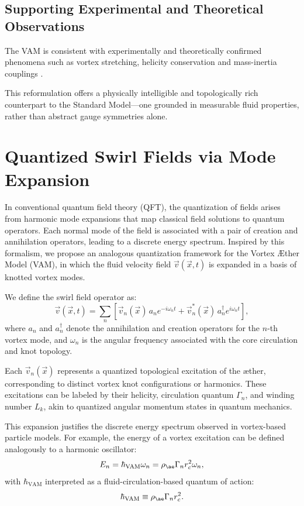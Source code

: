 \subsection*{Supporting Experimental and Theoretical Observations}
The VAM is consistent with experimentally and theoretically confirmed phenomena such as vortex stretching, helicity conservation and mass-inertia couplings \cite{batchelor1953,vinen2002,bewley2008,moffatt1969,kleckner2013,scheeler2014,bartlett1986}.

This reformulation offers a physically intelligible and topologically rich counterpart to the Standard Model—one grounded in measurable fluid properties, rather than abstract gauge symmetries alone.

\section{Quantized Swirl Fields via Mode Expansion}

In conventional quantum field theory (QFT), the quantization of fields arises from harmonic mode expansions that map classical field solutions to quantum operators. Each normal mode of the field is associated with a pair of creation and annihilation operators, leading to a discrete energy spectrum. Inspired by this formalism, we propose an analogous quantization framework for the Vortex Æther Model (VAM), in which the fluid velocity field $\vec{v}(\vec{x}, t)$ is expanded in a basis of knotted vortex modes.

We define the swirl field operator as:
\begin{equation}
\vec{v}(\vec{x}, t) = \sum_n \left[ \vec{v}_n(\vec{x})\, a_n e^{-i\omega_n t} + \vec{v}_n^*(\vec{x})\, a_n^\dagger e^{i\omega_n t} \right],
\end{equation}
where $a_n$ and $a_n^\dagger$ denote the annihilation and creation operators for the $n$-th vortex mode, and $\omega_n$ is the angular frequency associated with the core circulation and knot topology.

Each $\vec{v}_n(\vec{x})$ represents a quantized topological excitation of the æther, corresponding to distinct vortex knot configurations or harmonics. These excitations can be labeled by their helicity, circulation quantum $\Gamma_n$, and winding number $L_k$, akin to quantized angular momentum states in quantum mechanics.

This expansion justifies the discrete energy spectrum observed in vortex-based particle models. For example, the energy of a vortex excitation can be defined analogously to a harmonic oscillator:
\begin{equation}
E_n = \hbar_{\text{VAM}} \omega_n = \rho_{\ae} \Gamma_n r_c^2 \omega_n,
\end{equation}
with $\hbar_{\text{VAM}}$ interpreted as a fluid-circulation-based quantum of action:
\begin{equation}
\hbar_{\text{VAM}} \equiv \rho_{\ae} \Gamma_n r_c^2.
\end{equation}

